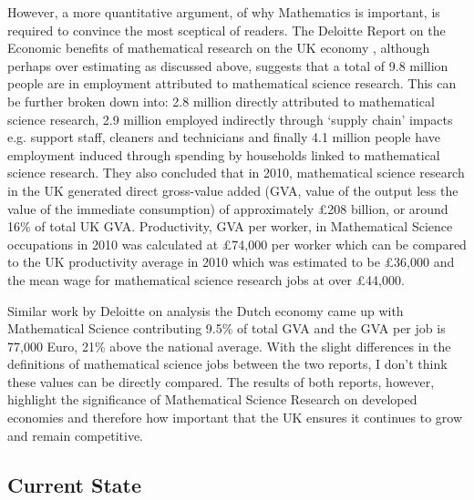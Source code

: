\documentclass[11pt]{article} %
\begin{document}
However, a more quantitative argument, of why Mathematics is important, is required to convince the most sceptical of readers. The Deloitte Report on the Economic benefits of mathematical research on the UK economy \cite{deloitteuk}, although perhaps over estimating as discussed above, suggests that a total of 9.8 million people are in employment attributed to mathematical science research. This can be further broken down into: 2.8 million  directly attributed to mathematical science research, 2.9 million employed indirectly through `supply chain' impacts e.g. support staff, cleaners and technicians and finally 4.1 million people have employment induced  through spending by households linked to mathematical science research. They also concluded that in 2010, mathematical science research in the UK generated direct gross-value added (GVA, value of the output less the value of the immediate consumption) of approximately £208 billion, or around 16\% of total UK GVA.  Productivity, GVA per worker, in Mathematical Science occupations in 2010 was calculated at £74,000 per worker which can be compared to the UK productivity average in 2010 which was estimated to be £36,000 and the mean wage for mathematical science research jobs at over £44,000. 
 
 Similar work by Deloitte on analysis the Dutch economy \cite{deloitteNL} came up with Mathematical Science contributing 9.5\% of total GVA and the GVA per job is 77,000 Euro, 21\% above the national average. With the slight differences in the  definitions of mathematical science jobs between the two reports, I don't think these values can be directly compared. The results of both reports, however,  highlight the significance of Mathematical Science Research on developed economies and therefore how important that the UK ensures it continues to grow and remain competitive.
 
 
	
	 
	\subsection{Current State \label{current state }}
	
\end{document}
